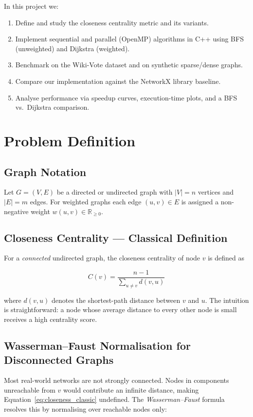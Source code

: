 \documentclass[12pt,a4paper]{article}
\begin{document}
In this project we:
\begin{enumerate}
  \item Define and study the closeness centrality metric and its variants.
  \item Implement sequential and parallel (OpenMP) algorithms in C++ using BFS (unweighted)
        and Dijkstra (weighted).
  \item Benchmark on the Wiki-Vote dataset and on synthetic sparse/dense graphs.
  \item Compare our implementation against the NetworkX library baseline.
  \item Analyse performance via speedup curves, execution-time plots, and a BFS vs.\
        Dijkstra comparison.
\end{enumerate}

\section{Problem Definition}
\label{sec:problem}

\subsection{Graph Notation}
Let $G = (V, E)$ be a directed or undirected graph with $|V| = n$ vertices and
$|E| = m$ edges.  For weighted graphs each edge $(u,v) \in E$ is assigned a non-negative
weight $w(u,v) \in \mathbb{R}_{\geq 0}$.

\subsection{Closeness Centrality — Classical Definition}
For a \emph{connected} undirected graph, the closeness centrality of node $v$ is defined as

\begin{equation}
  C(v) = \frac{n - 1}{\displaystyle\sum_{u \neq v} d(v, u)}
  \label{eq:closeness_classic}
\end{equation}

where $d(v, u)$ denotes the shortest-path distance between $v$ and $u$.  The intuition is
straightforward: a node whose average distance to every other node is small receives a high
centrality score.

\subsection{Wasserman--Faust Normalisation for Disconnected Graphs}
Most real-world networks are not strongly connected.  Nodes in components unreachable from
$v$ would contribute an infinite distance, making Equation~\eqref{eq:closeness_classic}
undefined.  The \emph{Wasserman--Faust} formula resolves this by normalising over
reachable nodes only:
\end{document}
